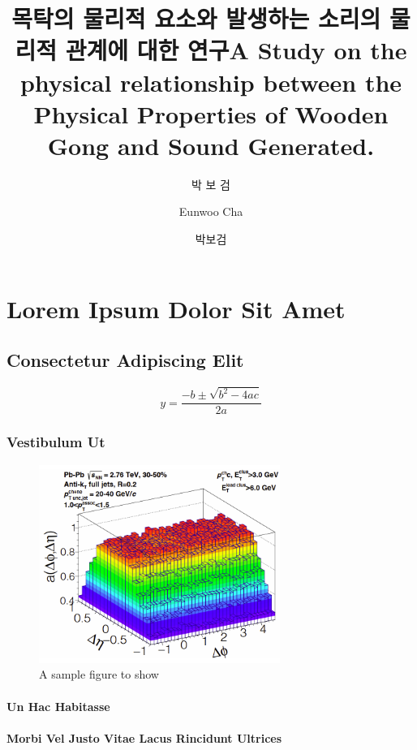 \documentclass[doctor, english]{pnuthesis}
\title[korean]{목탁의 물리적 요소와 발생하는 소리의 물리적 관계에 대한 연구}
\title[english]{A Study on the physical relationship between the Physical Properties of Wooden Gong and Sound Generated.}
\author[korean]{박 보 검}
\author[english]{Eunwoo Cha}
\author[nospace]{박보검}
\begin{document}
\renewcommand{\baselinestretch}{1.5}    %
\selectfont                             %

\changepage{5mm}{}{}{}{}{}{}{}{-5mm}    %
\makelists   %



\chapter{Lorem Ipsum Dolor Sit Amet}
\lipsum[1]
\section{Consectetur Adipiscing Elit}
\lipsum[2-3]
\begin{equation}
	y = \frac{-b \pm \sqrt{b^2-4ac}}{2a}
\end{equation}
\lipsum[11]
\subsection{Vestibulum Ut}
\lipsum[4]
\begin{figure}
	\centering
	\includegraphics[width=0.7\textwidth]{samples/samplefig1.png}
	\caption{A sample figure to show}
\end{figure}
\lipsum[15]
\subsubsection{Un Hac Habitasse}
\lipsum[5]
\subsubsection{Morbi Vel Justo Vitae Lacus Rincidunt Ultrices}
\lipsum[6]
\end{document}
